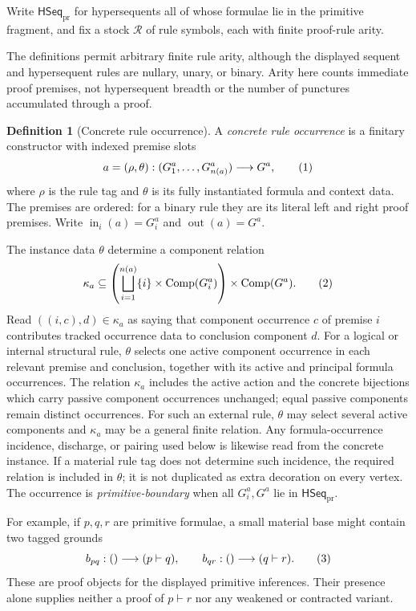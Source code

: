 \documentclass[10pt,a4paper]{article}
\theoremstyle{plain}
\theoremstyle{definition}
\newtheorem{definition}[theorem]{Definition}
\theoremstyle{remark}
\newcommand{\Rules}{\mathcal R}
\newcommand{\ms}{\mathrel{\vdash}}
\newcommand{\HSeq}{\mathsf{HSeq}}
\newcommand{\Comp}{\operatorname{Comp}}
\newcommand{\eqtag}{\refstepcounter{equation}\tag{\theequation}}
\begin{document}
Write \(\HSeq_{\mathrm{pr}}\) for hypersequents all of whose formulae lie
in the primitive fragment, and fix a stock \(\Rules\) of rule symbols,
each with finite proof-rule arity.

The definitions permit arbitrary finite rule arity, although the displayed
sequent and hypersequent rules are nullary, unary, or binary.  Arity here
counts immediate proof premises, not hypersequent breadth or the number of
punctures accumulated through a proof.

\begin{definition}[Concrete rule occurrence]
\label{def:concrete-occurrence}
A \emph{concrete rule occurrence} is a finitary constructor with indexed
premise slots
\[
 a=(\rho,\theta):
   (G^a_1,\ldots,G^a_{n(a)})\longrightarrow G^a ,
\eqtag\label{eq:equipped-rule}
\]
where \(\rho\) is the rule tag and \(\theta\) is its fully instantiated
formula and context data.  The premises are ordered: for a binary rule they
are its literal left and right proof premises.  Write
\(\operatorname{in}_i(a)=G^a_i\) and
\(\operatorname{out}(a)=G^a\).
\end{definition}

The instance data \(\theta\) determine a component relation
\[
 \kappa_a\subseteq
 \left(\bigsqcup_{i=1}^{n(a)}
    \{i\}\times\Comp(G^a_i)\right)
 \times\Comp(G^a).
\eqtag\label{eq:component-relation}
\]
Read \(((i,c),d)\in\kappa_a\) as saying that component occurrence \(c\)
of premise \(i\) contributes tracked occurrence data to conclusion
component \(d\).
For a logical or internal structural rule, \(\theta\) selects one active
component occurrence in each relevant premise and conclusion, together
with its active and principal formula occurrences.  The relation
\(\kappa_a\) includes the active action and the concrete bijections which
carry passive component occurrences unchanged; equal passive components
remain distinct occurrences.  For such an external rule, \(\theta\)
may select several active components and \(\kappa_a\) may be a general
finite relation.  Any formula-occurrence incidence, discharge, or pairing
used below is likewise read from the concrete instance.  If a material rule tag
does not determine such incidence, the required relation is included in
\(\theta\); it is not duplicated as extra decoration on every vertex.
The occurrence is \emph{primitive-boundary} when all \(G^a_i,G^a\) lie in
\(\HSeq_{\mathrm{pr}}\).

For example, if \(p,q,r\) are primitive formulae, a small material base
might contain two tagged grounds
\[
 b_{pq}:()\longrightarrow(p\ms q),
 \qquad
 b_{qr}:()\longrightarrow(q\ms r).
\eqtag\label{eq:small-material-base}
\]
These are proof objects for the displayed primitive inferences.  Their
presence alone supplies neither a proof of \(p\ms r\) nor any weakened or
contracted variant.
\end{document}
